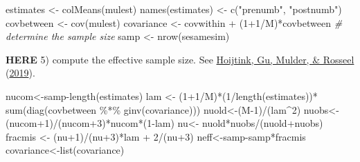 \documentclass[
]{book}
\newenvironment{Shaded}{\begin{snugshade}}{\end{snugshade}}
\newcommand{\CommentTok}[1]{\textcolor[rgb]{0.56,0.35,0.01}{\textit{#1}}}
\newcommand{\DecValTok}[1]{\textcolor[rgb]{0.00,0.00,0.81}{#1}}
\newcommand{\FunctionTok}[1]{\textcolor[rgb]{0.00,0.00,0.00}{#1}}
\newcommand{\NormalTok}[1]{#1}
\newcommand{\OtherTok}[1]{\textcolor[rgb]{0.56,0.35,0.01}{#1}}
\newcommand{\SpecialCharTok}[1]{\textcolor[rgb]{0.00,0.00,0.00}{#1}}
\newcommand{\StringTok}[1]{\textcolor[rgb]{0.31,0.60,0.02}{#1}}
\begin{document}
\begin{Shaded}
\begin{Highlighting}[]
\NormalTok{estimates }\OtherTok{\textless{}{-}} \FunctionTok{colMeans}\NormalTok{(mulest)}
\FunctionTok{names}\NormalTok{(estimates) }\OtherTok{\textless{}{-}} \FunctionTok{c}\NormalTok{(}\StringTok{"prenumb"}\NormalTok{, }\StringTok{"postnumb"}\NormalTok{)}
\NormalTok{covbetween }\OtherTok{\textless{}{-}} \FunctionTok{cov}\NormalTok{(mulest)}
\NormalTok{covariance }\OtherTok{\textless{}{-}}\NormalTok{ covwithin }\SpecialCharTok{+}\NormalTok{ (}\DecValTok{1}\SpecialCharTok{+}\DecValTok{1}\SpecialCharTok{/}\NormalTok{M)}\SpecialCharTok{*}\NormalTok{covbetween}
\CommentTok{\# determine the sample size}
\NormalTok{samp }\OtherTok{\textless{}{-}} \FunctionTok{nrow}\NormalTok{(sesamesim)}
\end{Highlighting}
\end{Shaded}

\textbf{HERE}
5) compute the effective sample size. See \protect\hyperlink{ref-hoijtink2019computing}{Hoijtink, Gu, Mulder, \& Rosseel} (\protect\hyperlink{ref-hoijtink2019computing}{2019}).

\begin{Shaded}
\begin{Highlighting}[]
\NormalTok{nucom}\OtherTok{\textless{}{-}}\NormalTok{samp}\SpecialCharTok{{-}}\FunctionTok{length}\NormalTok{(estimates)}
\NormalTok{lam }\OtherTok{\textless{}{-}}\NormalTok{ (}\DecValTok{1}\SpecialCharTok{+}\DecValTok{1}\SpecialCharTok{/}\NormalTok{M)}\SpecialCharTok{*}\NormalTok{(}\DecValTok{1}\SpecialCharTok{/}\FunctionTok{length}\NormalTok{(estimates))}\SpecialCharTok{*} \FunctionTok{sum}\NormalTok{(}\FunctionTok{diag}\NormalTok{(covbetween }\SpecialCharTok{\%*\%} \FunctionTok{ginv}\NormalTok{(covariance)))}
\NormalTok{nuold}\OtherTok{\textless{}{-}}\NormalTok{(M}\DecValTok{{-}1}\NormalTok{)}\SpecialCharTok{/}\NormalTok{(lam}\SpecialCharTok{\^{}}\DecValTok{2}\NormalTok{)}
\NormalTok{nuobs}\OtherTok{\textless{}{-}}\NormalTok{(nucom}\SpecialCharTok{+}\DecValTok{1}\NormalTok{)}\SpecialCharTok{/}\NormalTok{(nucom}\SpecialCharTok{+}\DecValTok{3}\NormalTok{)}\SpecialCharTok{*}\NormalTok{nucom}\SpecialCharTok{*}\NormalTok{(}\DecValTok{1}\SpecialCharTok{{-}}\NormalTok{lam)}
\NormalTok{nu}\OtherTok{\textless{}{-}}\NormalTok{ nuold}\SpecialCharTok{*}\NormalTok{nuobs}\SpecialCharTok{/}\NormalTok{(nuold}\SpecialCharTok{+}\NormalTok{nuobs)}
\NormalTok{fracmis }\OtherTok{\textless{}{-}}\NormalTok{ (nu}\SpecialCharTok{+}\DecValTok{1}\NormalTok{)}\SpecialCharTok{/}\NormalTok{(nu}\SpecialCharTok{+}\DecValTok{3}\NormalTok{)}\SpecialCharTok{*}\NormalTok{lam }\SpecialCharTok{+} \DecValTok{2}\SpecialCharTok{/}\NormalTok{(nu}\SpecialCharTok{+}\DecValTok{3}\NormalTok{)}
\NormalTok{neff}\OtherTok{\textless{}{-}}\NormalTok{samp}\SpecialCharTok{{-}}\NormalTok{samp}\SpecialCharTok{*}\NormalTok{fracmis}
\NormalTok{covariance}\OtherTok{\textless{}{-}}\FunctionTok{list}\NormalTok{(covariance)}
\end{Highlighting}
\end{Shaded}
\end{document}
